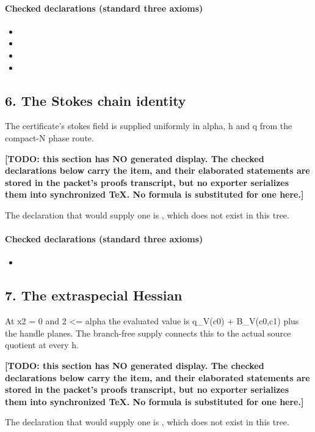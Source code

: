 \paragraph{Checked declarations (standard three axioms)}
\begin{itemize}
\item {}
\item {}
\item {}
\item {}
\end{itemize}

\subsection*{6. The Stokes chain identity}
The certificate's stokes field is supplied uniformly in alpha, h and q from the compact-N phase route.

\par\noindent\textbf{[TODO: this section has NO generated display. The checked declarations below carry the item, and their elaborated statements are stored in the packet's proofs transcript, but no exporter serializes them into synchronized TeX. No formula is substituted for one here.]}
\par\noindent The declaration that would supply one is , which does not exist in this tree.
\paragraph{Checked declarations (standard three axioms)}
\begin{itemize}
\item {}
\end{itemize}

\subsection*{7. The extraspecial Hessian}
At x2 = 0 and 2 <= alpha the evaluated value is q\_V(c0) + B\_V(c0,c1) plus the handle planes. The branch-free supply connects this to the actual source quotient at every h.

\par\noindent\textbf{[TODO: this section has NO generated display. The checked declarations below carry the item, and their elaborated statements are stored in the packet's proofs transcript, but no exporter serializes them into synchronized TeX. No formula is substituted for one here.]}
\par\noindent The declaration that would supply one is , which does not exist in this tree.
